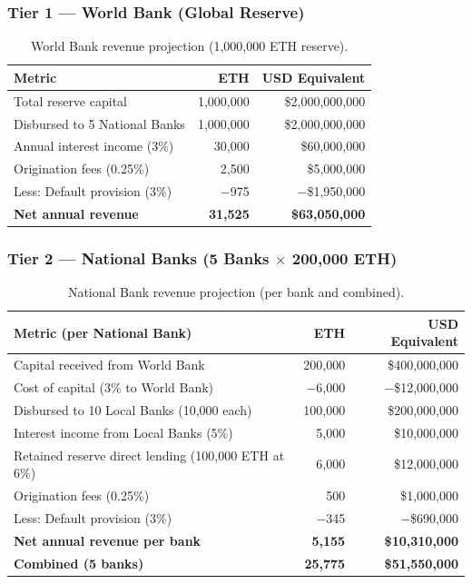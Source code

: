 \documentclass[11pt,a4paper]{article}
\newcommand{\tableheadfont}{\bfseries\small\color{PrimaryBlue}}
\newenvironment{moderntable}[1][H]{%
    \begin{table}[#1]\centering\small%
    \renewcommand{\arraystretch}{1.35}%
}{%
    \end{table}%
}
\begin{document}
\subsubsection{Tier 1 --- World Bank (Global Reserve)}

\begin{moderntable}
\caption{World Bank revenue projection (1,000,000 ETH reserve).}
\begin{tabular}{@{} >{\raggedright}p{6cm} r r @{}}
\toprule
\tableheadfont Metric & \tableheadfont ETH & \tableheadfont USD Equivalent \\
\midrule
\rowcolor{RowShade}
Total reserve capital & 1,000,000 & \$2,000,000,000 \\
Disbursed to 5 National Banks & 1,000,000 & \$2,000,000,000 \\
\rowcolor{RowShade}
Annual interest income (3\%) & 30,000 & \$60,000,000 \\
Origination fees (0.25\%) & 2,500 & \$5,000,000 \\
\rowcolor{RowShade}
Less: Default provision (3\%) & $-$975 & $-$\$1,950,000 \\
\midrule
\textbf{Net annual revenue} & \textbf{31,525} & \textbf{\$63,050,000} \\
\bottomrule
\end{tabular}
\end{moderntable}

\subsubsection{Tier 2 --- National Banks (5 Banks $\times$ 200,000 ETH)}

\begin{moderntable}
\caption{National Bank revenue projection (per bank and combined).}
\begin{tabular}{@{} >{\raggedright}p{6cm} r r @{}}
\toprule
\tableheadfont Metric (per National Bank) & \tableheadfont ETH & \tableheadfont USD Equivalent \\
\midrule
\rowcolor{RowShade}
Capital received from World Bank & 200,000 & \$400,000,000 \\
Cost of capital (3\% to World Bank) & $-$6,000 & $-$\$12,000,000 \\
\rowcolor{RowShade}
Disbursed to 10 Local Banks (10,000 each) & 100,000 & \$200,000,000 \\
Interest income from Local Banks (5\%) & 5,000 & \$10,000,000 \\
\rowcolor{RowShade}
Retained reserve direct lending (100,000 ETH at 6\%) & 6,000 & \$12,000,000 \\
Origination fees (0.25\%) & 500 & \$1,000,000 \\
\rowcolor{RowShade}
Less: Default provision (3\%) & $-$345 & $-$\$690,000 \\
\midrule
\textbf{Net annual revenue per bank} & \textbf{5,155} & \textbf{\$10,310,000} \\
\rowcolor{MidBlue}
\textbf{Combined (5 banks)} & \textbf{25,775} & \textbf{\$51,550,000} \\
\bottomrule
\end{tabular}
\end{moderntable}
\end{document}
